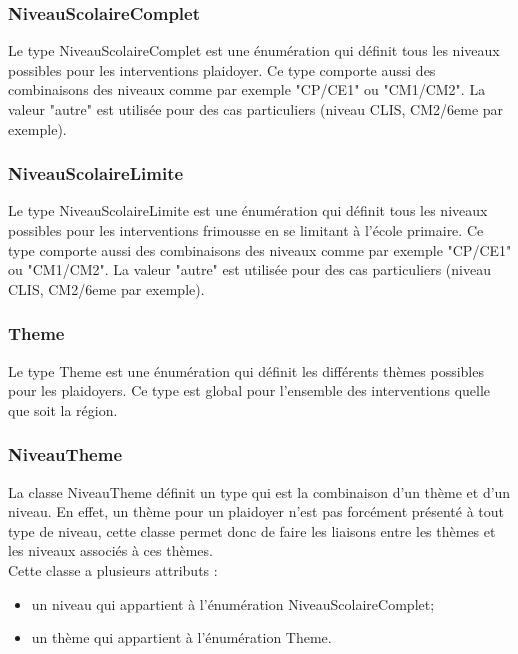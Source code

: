 \subsubsection*{NiveauScolaireComplet}

Le type NiveauScolaireComplet est une énumération qui définit tous les niveaux possibles pour les interventions plaidoyer. Ce type comporte aussi des combinaisons des niveaux comme par exemple "CP/CE1" ou "CM1/CM2". La valeur "autre" est utilisée pour des cas particuliers (niveau CLIS, CM2/6eme par exemple).

\subsubsection*{NiveauScolaireLimite}

Le type NiveauScolaireLimite est une énumération qui définit tous les niveaux possibles pour les interventions frimousse en se limitant à l'école primaire. Ce type comporte aussi des combinaisons des niveaux comme par exemple "CP/CE1" ou "CM1/CM2". La valeur "autre" est utilisée pour des cas particuliers (niveau CLIS, CM2/6eme par exemple).

\subsubsection*{Theme}

Le type Theme est une énumération qui définit les différents thèmes possibles pour les plaidoyers. Ce type est global pour l'ensemble des interventions quelle que soit la région.  

\subsubsection*{NiveauTheme}

La classe NiveauTheme définit un type qui est la combinaison d'un thème et d'un niveau. En effet, un thème pour un plaidoyer n'est pas forcément présenté à tout type de niveau, cette classe permet donc de faire les liaisons entre les thèmes et les niveaux associés à ces thèmes.\\
Cette classe a plusieurs attributs : 
\begin{itemize}
\item un niveau qui appartient à l'énumération NiveauScolaireComplet;
\item un thème qui appartient à l'énumération Theme.
\end{itemize}


